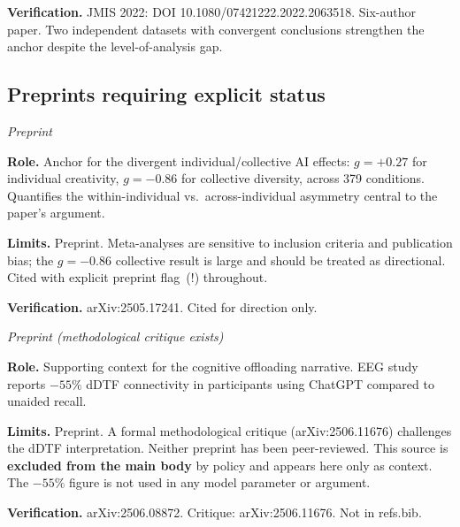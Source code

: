 \documentclass[11pt,a4paper]{article}
\begin{document}
\begin{appendices}
\begin{description}[style=nextline, leftmargin=0pt, labelindent=0pt]
\textbf{Verification.}
JMIS 2022: DOI 10.1080/07421222.2022.2063518. Six-author paper. Two
independent datasets with convergent conclusions strengthen the anchor
despite the level-of-analysis gap.

\end{description}

\subsection{Preprints requiring explicit status}\label{app:bib:preprints}

\begin{description}[style=nextline, leftmargin=0pt, labelindent=0pt]

\item[\cite{holzner_arxiv_2025} --- Holzner, Maier \& Feuerriegel (2025),
arXiv.]
\hfill\textit{Preprint}

\textbf{Role.}
Anchor for the divergent individual/collective AI effects: $g = +0.27$ for
individual creativity, $g = -0.86$ for collective diversity, across 379
conditions. Quantifies the within-individual vs.\ across-individual
asymmetry central to the paper's argument.

\textbf{Limits.}
Preprint. Meta-analyses are sensitive to inclusion criteria and publication
bias; the $g = -0.86$ collective result is large and should be treated as
directional. Cited with explicit preprint flag~(!) throughout.

\textbf{Verification.}
arXiv:2505.17241. Cited for direction only.

\item[\cite{kosmyna_mit_2025} --- Kosmyna et al.\ (2025), arXiv:2506.08872.]
\hfill\textit{Preprint (methodological critique exists)}

\textbf{Role.}
Supporting context for the cognitive offloading narrative. EEG study reports
$-55\%$ dDTF connectivity in participants using ChatGPT compared to unaided
recall.

\textbf{Limits.}
Preprint. A formal methodological critique (arXiv:2506.11676) challenges the
dDTF interpretation. Neither preprint has been peer-reviewed. This source is
\textbf{excluded from the main body} by policy and appears here only as
context. The $-55\%$ figure is not used in any model parameter or argument.

\textbf{Verification.}
arXiv:2506.08872. Critique: arXiv:2506.11676. Not in refs.bib.


\end{description}
\end{appendices}
\end{document}
